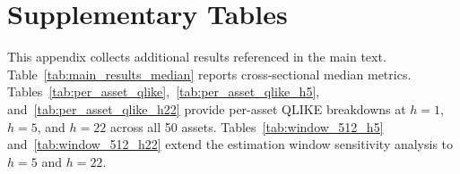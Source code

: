\documentclass[12pt]{article}
\begin{document}




\FloatBarrier
\appendix

\section{Supplementary Tables}
\label{sec:appendix_tables}

This appendix collects additional results referenced in the main text. Table~\ref{tab:main_results_median} reports cross-sectional median metrics. Tables~\ref{tab:per_asset_qlike},~\ref{tab:per_asset_qlike_h5}, and~\ref{tab:per_asset_qlike_h22} provide per-asset QLIKE breakdowns at $h = 1$, $h = 5$, and $h = 22$ across all 50 assets. Tables~\ref{tab:window_512_h5} and~\ref{tab:window_512_h22} extend the estimation window sensitivity analysis to $h = 5$ and $h = 22$.



\FloatBarrier







\FloatBarrier





\FloatBarrier
\end{document}
